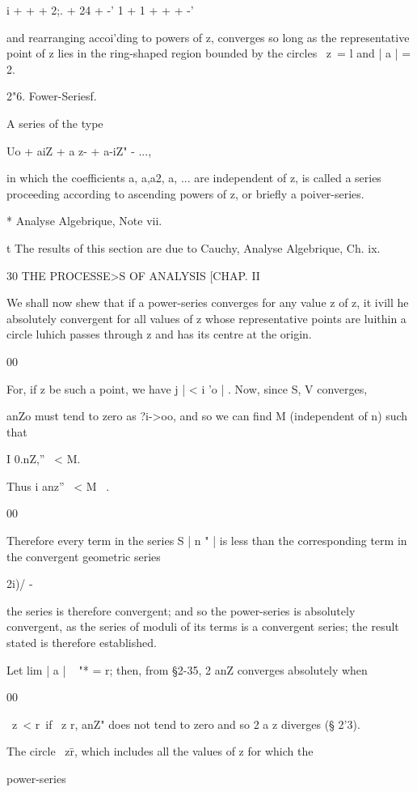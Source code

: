 i + + + 2;. + 24 + -' 1 + 1 + + + -'

and rearranging accoi'ding to powers of z, converges so long as the
representative point of z lies in the ring-shaped region bounded by
the circles \ z\ = l and | a | = 2.

2"6. Fower-Seriesf.

A series of the type

Uo + aiZ + a z- + a-iZ" - ...,

in which the coefficients a, a,a2, a, ... are independent of z, is
called a series proceeding according to ascending powers of z, or
briefly a poiver-series.

* Analyse Algebrique, Note vii.

t The results of this section are due to Cauchy, Analyse Algebrique,
Ch. ix.



  30 THE PROCESSE>S OF ANALYSIS [CHAP. II

We shall now shew that if a power-series converges for any value z of
z, it ivill he absolutely convergent for all values of z whose
representative points are luithin a circle luhich passes through z and
has its centre at the origin.

00

For, if z be such a point, we have j | < i 'o | . Now, since S, V
converges,

anZo must tend to zero as ?i->oo, and so we can find M (independent
of n) such that

I 0.nZ,'' \ < M.

Thus i anz'' \ < M \ .

00

Therefore every term in the series S | n " | is less than the
corresponding term in the convergent geometric series

2i)/ -

the series is therefore convergent; and so the power-series is
absolutely convergent, as the series of moduli of its terms is a
convergent series; the result stated is therefore established.

Let lim | a | ~ "* = r; then, from §2-35, 2 anZ converges absolutely
when

00

\ z\ < r\ if \ z r, anZ" does not tend to zero and so 2 a z diverges
(§ 2'3).

The circle \ z\=r, which includes all the values of z for which the

power-series

